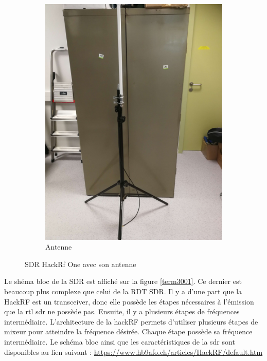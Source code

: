 \begin{figure}[h]
\begin{subfigure}{0.4\textwidth}
  \includegraphics[width=\textwidth]{images/pied.png}
  \caption{Antenne}
  \label{term340}
\end{subfigure}
\caption{SDR HackRf One avec son antenne}
\label{bothimages}
\end{figure}


Le shéma bloc de la SDR est affiché sur la figure \ref{term3001}. Ce dernier est beaucoup plus complexe que celui de la RDT SDR. Il y a d'une part que la HackRF est un transceiver, donc elle possède les étapes nécessaires à l'émission que la rtl sdr ne possède pas. Ensuite, il y a plusieurs étapes de fréquences intermédiaire. L'architecture de la hackRF permets d'utiliser plusieurs étapes de mixeur pour atteindre la fréquence désirée. Chaque étape possède sa fréquence intermédiaire. Le schéma bloc ainsi que les caractéristiques de la sdr sont disponibles au lien suivant : \href{https://www.hb9afo.ch/articles/HackRF/default.htm}{https://www.hb9afo.ch/articles/HackRF/default.htm}

